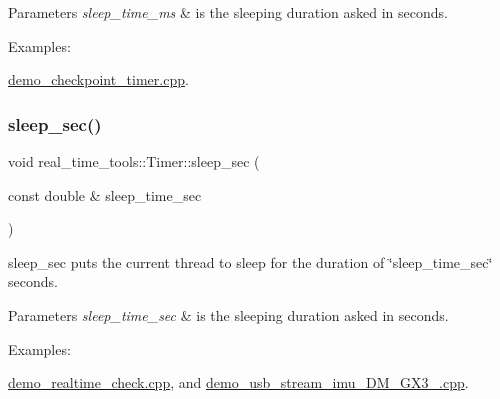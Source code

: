 \begin{DoxyParams}{Parameters}
{\em sleep\+\_\+time\+\_\+ms} & is the sleeping duration asked in seconds. \\
\hline
\end{DoxyParams}
\begin{Desc}
\item[Examples\+: ]\par
\hyperlink{demo_checkpoint_timer_8cpp-example}{demo\+\_\+checkpoint\+\_\+timer.\+cpp}.\end{Desc}
\mbox{\label{classreal__time__tools_1_1Timer_a0a0df8a3baef34e820203e5579afda38}} 
\subsubsection{\texorpdfstring{sleep\+\_\+sec()}{sleep\_sec()}}
{\footnotesize\ttfamily void real\+\_\+time\+\_\+tools\+::\+Timer\+::sleep\+\_\+sec (\begin{DoxyParamCaption}\item[{const double \&}]{sleep\+\_\+time\+\_\+sec }\end{DoxyParamCaption})\hspace{0.3cm}{\ttfamily [static]}}



sleep\+\_\+sec puts the current thread to sleep for the duration of \char`\"{}sleep\+\_\+time\+\_\+sec\char`\"{} seconds. 


\begin{DoxyParams}{Parameters}
{\em sleep\+\_\+time\+\_\+sec} & is the sleeping duration asked in seconds. \\
\hline
\end{DoxyParams}
\begin{Desc}
\item[Examples\+: ]\par
\hyperlink{demo_realtime_check_8cpp-example}{demo\+\_\+realtime\+\_\+check.\+cpp}, and \hyperlink{demo_usb_stream_imu_3DM_GX3_25_8cpp-example}{demo\+\_\+usb\+\_\+stream\+\_\+imu\+\_\+D\+M\+\_\+\+G\+X3\+\_.\+cpp}.\end{Desc}
\mbox{\label{classreal__time__tools_1_1Timer_a8de5eedf9fe5607d78a703cd22665137}} 
